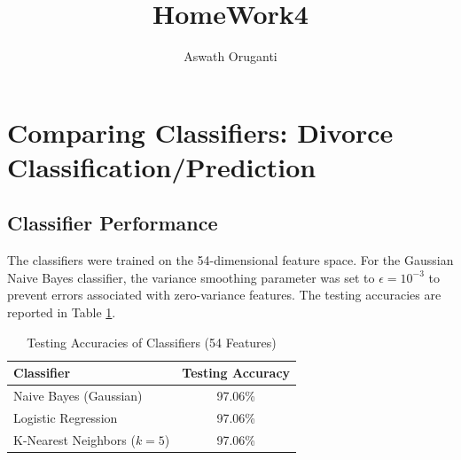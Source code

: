 \documentclass[twoside, 10pt]{article}
\begin{document}
\title{\textbf{\Large HomeWork4}}
\author{Aswath Oruganti}
\maketitle

\section{Comparing Classifiers: Divorce Classification/Prediction}
\subsection{Classifier Performance}
The classifiers were trained on the 54-dimensional feature space. For the Gaussian Naive Bayes classifier, the variance smoothing parameter was set to $\epsilon = 10^{-3}$ to prevent errors associated with zero-variance features. The testing accuracies are reported in Table \ref{tab:accuracies}.
\begin{table}[h]
    \centering
    \caption{Testing Accuracies of Classifiers (54 Features)}\label{tab:accuracies}
    \vspace{0.1in}
    \begin{tabular}{lc}
        \toprule
        \textbf{Classifier} & \textbf{Testing Accuracy} \\
        \midrule
        Naive Bayes (Gaussian) & 97.06\% \\
        Logistic Regression & 97.06\% \\
        K-Nearest Neighbors ($k=5$) & 97.06\% \\
        \bottomrule
    \end{tabular}
\end{table}
\end{document}
